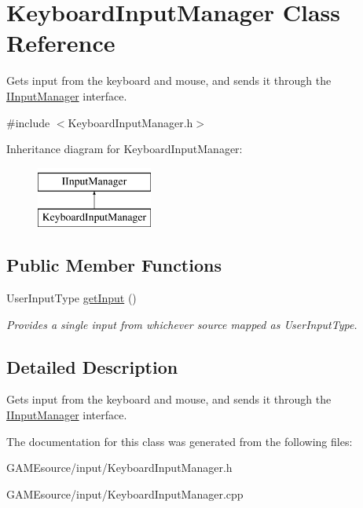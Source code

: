 \hypertarget{class_keyboard_input_manager}{}\section{Keyboard\+Input\+Manager Class Reference}
\label{class_keyboard_input_manager}


Gets input from the keyboard and mouse, and sends it through the \mbox{\hyperlink{class_i_input_manager}{I\+Input\+Manager}} interface.  




{\ttfamily \#include $<$Keyboard\+Input\+Manager.\+h$>$}

Inheritance diagram for Keyboard\+Input\+Manager\+:\begin{figure}[H]
\begin{center}
\leavevmode
\includegraphics[height=2.000000cm]{class_keyboard_input_manager}
\end{center}
\end{figure}
\subsection*{Public Member Functions}
\begin{DoxyCompactItemize}
\item 
\mbox{\label{class_keyboard_input_manager_a8cb1844b5ac0c023294a6a2378440c92}} 
User\+Input\+Type \mbox{\hyperlink{class_keyboard_input_manager_a8cb1844b5ac0c023294a6a2378440c92}{get\+Input}} ()
\begin{DoxyCompactList}\small\item\em Provides a single input from whichever source mapped as User\+Input\+Type. \end{DoxyCompactList}\end{DoxyCompactItemize}


\subsection{Detailed Description}
Gets input from the keyboard and mouse, and sends it through the \mbox{\hyperlink{class_i_input_manager}{I\+Input\+Manager}} interface. 

The documentation for this class was generated from the following files\+:\begin{DoxyCompactItemize}
\item 
G\+A\+M\+Esource/input/Keyboard\+Input\+Manager.\+h\item 
G\+A\+M\+Esource/input/Keyboard\+Input\+Manager.\+cpp\end{DoxyCompactItemize}
